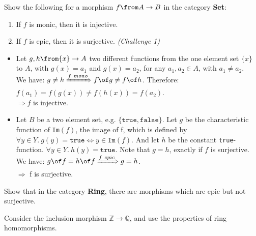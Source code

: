 \begin{exercise}
  Show the following for a morphism $f \from A \to B$ in the category \textbf{Set}:
  \begin{enumerate}
  \item If $f$ is monic, then it is injective.
  \item If $f$ is epic, then it is surjective. \textit{(Challenge 1)}
  \end{enumerate}
\end{exercise}

\begin{answer}
  \begin{itemize}
  \item Let $g,h \from \{x\} \to A$ two different functions
    from the one element set
    $\{x\}$ to $A$, with $g(x) = a_1$ and $g(x) = a_2$,
    for any $a_1,a_2 \in A$, with $a_1 \neq a_2$.\\
    We have: $g \neq h \xRightarrow{f \ mono} f \of g \neq f \of h$.
    Therefore: $f(a_1) = f(g(x)) \neq f(h(x)) = f(a_2)$.\\
    $\Rightarrow f$ is injective.
  \item Let $B$ be a two element set, e.g.
    $\{ \texttt{true}, \texttt{false}\}$.
    Let $g$ be the characteristic function of \texttt{Im}$(f)$,
    the image of f, which is defined by
    $\forall y \in Y. \ g(y) = \texttt{true}
    \Leftrightarrow y \in \texttt{Im}(f)$.
    And let $h$ be the constant \texttt{true}-function.
    $\forall y \in Y. \ h(y) = \texttt{true}$.
    Note that $g = h$, exactly if $f$ is surjective.\\
    We have: $g \of f = h \of f \xRightarrow{f \ epic} g = h$.\\
    $\Rightarrow$ f is surjective.
  \end{itemize}
\end{answer}

\begin{exercise}[Challenge 2]
  Show that in the category \textbf{Ring}, there are morphisms which are epic but not surjective.
  \begin{hint}
    Consider the inclusion morphism $\mathbb{Z} \to \mathbb{Q}$, and use the properties of ring homomorphisms.
  \end{hint}
\end{exercise}

